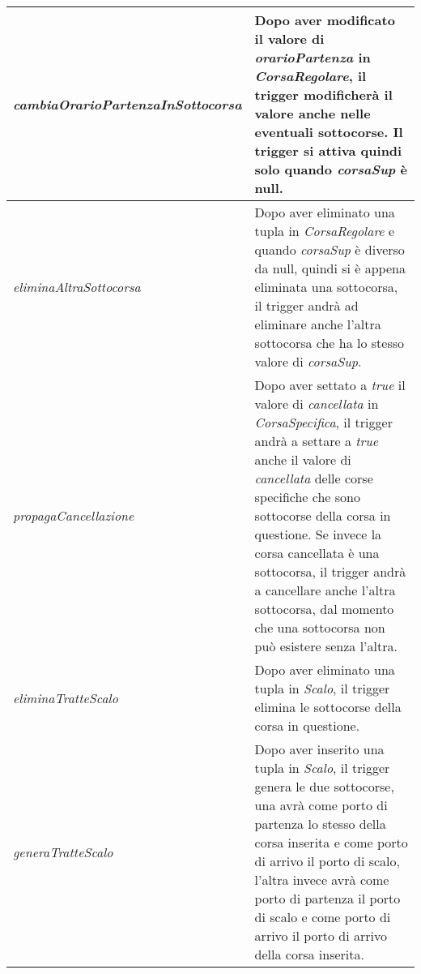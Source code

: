 \begin{longtable}{|| m{} | m{} ||}
      \textit{cambiaOrarioPartenzaInSottocorsa} & Dopo aver modificato il valore di \textit{orarioPartenza} in \textit{CorsaRegolare}, il trigger modificherà il valore anche nelle eventuali sottocorse. Il trigger si attiva quindi solo quando \textit{corsaSup} è null. \\ [1ex]
      \hline

      \textit{eliminaAltraSottocorsa} & Dopo aver eliminato una tupla in \textit{CorsaRegolare} e quando \textit{corsaSup} è diverso da null, quindi si è appena eliminata una sottocorsa, il trigger andrà ad eliminare anche l'altra sottocorsa che ha lo stesso valore di \textit{corsaSup}. \\ [1ex]
      \hline

      \textit{propagaCancellazione} & Dopo aver settato a \textit{true} il valore di \textit{cancellata} in \textit{CorsaSpecifica}, il trigger andrà a settare a \textit{true} anche il valore di \textit{cancellata} delle corse specifiche che sono sottocorse della corsa in questione. Se invece la corsa cancellata è una sottocorsa, il trigger andrà a cancellare anche l'altra sottocorsa, dal momento che una sottocorsa non può esistere senza l'altra. \\ [1ex]
      \hline

      \textit{eliminaTratteScalo} & Dopo aver eliminato una tupla in \textit{Scalo}, il trigger elimina le sottocorse della corsa in questione. \\ [1ex]
      \hline

      \textit{generaTratteScalo} & Dopo aver inserito una tupla in \textit{Scalo}, il trigger genera le due sottocorse, una avrà come porto di partenza lo stesso della corsa inserita e come porto di arrivo il porto di scalo, l'altra invece avrà come porto di partenza il porto di scalo e come porto di arrivo il porto di arrivo della corsa inserita. \\ [1ex]          
     \hline\hline
\end{longtable}










